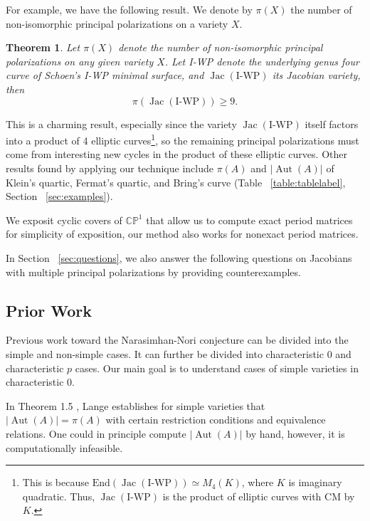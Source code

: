 \documentclass[12pt,reqno]{amsart}
\DeclareMathOperator{\Aut}{Aut}
\DeclareMathOperator{\Jac}{Jac}
\newcommand{\C}{\mathbb{C}}
\renewcommand{\P}{\mathbb{P}}
\newtheorem{theorem}{Theorem}
\theoremstyle{definition}
\theoremstyle{remark}
\newtheorem*{remark}{Remark}
\begin{document}
For example, we have the following result. We denote by $\pi(X)$ the number of non-isomorphic principal polarizations on a variety $X.$

\begin{theorem} \label{IWP} Let $\pi(X)$ denote the number of non-isomorphic principal polarizations on any given variety $X$. Let I-WP denote the underlying genus four curve of Schoen's I-WP minimal surface, and $\Jac(\text{I-WP})$ its Jacobian variety, then $$\pi(\Jac(\text{I-WP})) \geq 9.$$\end{theorem}

This is a charming result, especially since the variety $\Jac(\text{I-WP})$ itself factors into a product of 4 elliptic curves\footnote{This is because $\text{End}(\Jac(\text{I-WP})) \simeq M_4(K)$, where $K$ is imaginary quadratic. Thus, $\Jac(\text{I-WP})$ is the product of elliptic curves with CM by $K$.}, so the remaining principal polarizations must come from interesting new cycles in the product of these elliptic curves. Other results found by applying our technique include $\pi(A)$ and $|\Aut(A)|$ of Klein's quartic, Fermat's quartic, and Bring's curve (Table ~\ref{table:tablelabel}, Section ~\ref{sec:examples}).

We exposit cyclic covers of $\C\P^1$ that allow us to compute exact period matrices for simplicity of exposition, our method also works for nonexact period matrices.

In Section ~\ref{sec:questions}, we also answer the following questions on Jacobians with multiple principal polarizations by providing counterexamples.

\subsection{Prior Work}
\label{sec:prior}
Previous work toward the Narasimhan-Nori conjecture can be divided into the simple and non-simple cases. %
It can further be divided into characteristic 0 and characteristic $p$ cases. Our main goal is to understand cases of simple varieties in characteristic 0. 

In Theorem 1.5 \cite{several}, Lange establishes for simple varieties that $|\Aut(A)| = \pi(A)$ with certain restriction conditions and equivalence relations. One could in principle compute $|\Aut(A)|$ by hand, however, it is computationally infeasible. 

\end{document}
